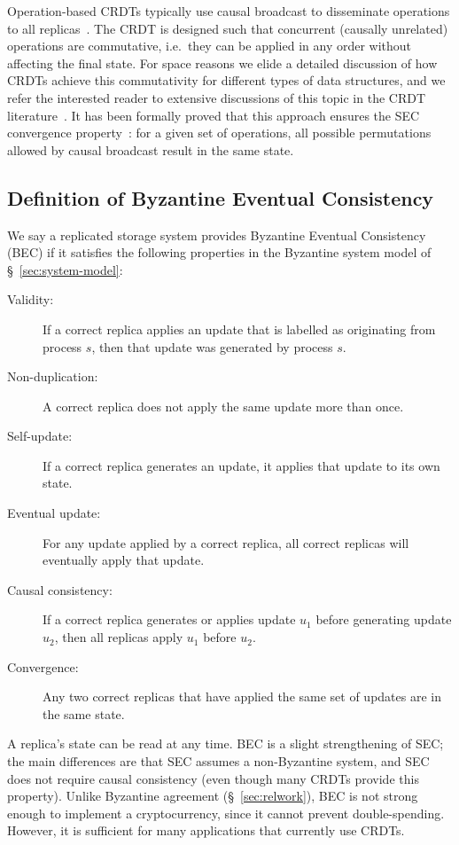 \documentclass[a4paper,anonymous,USenglish]{lipics-v2019}
\begin{document}
Operation-based CRDTs typically use causal broadcast to disseminate operations to all replicas~\cite{Gomes:2017gy,Shapiro:2011}.
The CRDT is designed such that concurrent (causally unrelated) operations are commutative, i.e.\ they can be applied in any order without affecting the final state.
For space reasons we elide a detailed discussion of how CRDTs achieve this commutativity for different types of data structures, and we refer the interested reader to extensive discussions of this topic in the CRDT literature~\cite{Shapiro:2011wy,Weiss:2009ht}.
It has been formally proved that this approach ensures the SEC convergence property~\cite{Gomes:2017gy}: for a given set of operations, all possible permutations allowed by causal broadcast result in the same state.

\subsection{Definition of Byzantine Eventual Consistency}

We say a replicated storage system provides Byzantine Eventual Consistency (BEC) if it satisfies the following properties in the Byzantine system model of \S~\ref{sec:system-model}:

\begin{description}
\item[Validity:] If a correct replica applies an update that is labelled as originating from process $s$, then that update was generated by process $s$.
\item[Non-duplication:] A correct replica does not apply the same update more than once.
\item[Self-update:] If a correct replica generates an update, it applies that update to its own state.
\item[Eventual update:] For any update applied by a correct replica, all correct replicas will eventually apply that update.
\item[Causal consistency:] If a correct replica generates or applies update $u_1$ before generating update $u_2$, then all replicas apply $u_1$ before $u_2$.
\item[Convergence:] Any two correct replicas that have applied the same set of updates are in the same state.
\end{description}

A replica's state can be read at any time.
BEC is a slight strengthening of SEC; the main differences are that SEC assumes a non-Byzantine system, and SEC does not require causal consistency (even though many CRDTs provide this property).
Unlike Byzantine agreement (\S~\ref{sec:relwork}), BEC is not strong enough to implement a cryptocurrency, since it cannot prevent double-spending.
However, it is sufficient for many applications that currently use CRDTs.
\end{document}
